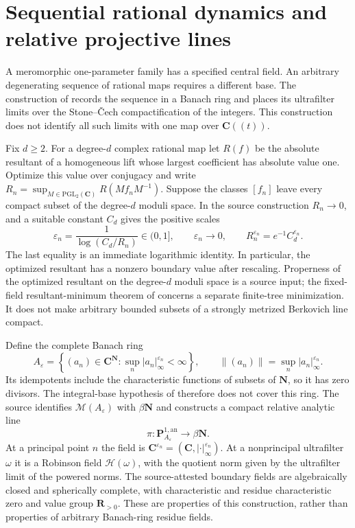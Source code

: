 \section{Sequential rational dynamics and relative projective lines}
\label{sec:hybrid-sequential-rational}

A meromorphic one-parameter family has a specified central field.
An arbitrary degenerating sequence of rational maps requires a different
base. The construction of \cite{FavreGong26SequentialV4} records the
sequence in a Banach ring and places its ultrafilter limits over the
Stone--\v{C}ech compactification of the integers. This construction
does not identify all such limits with one map over $\mathbf C((t))$.

Fix $d\geq2$. For a degree-$d$ complex rational map let $R(f)$ be
the absolute resultant of a homogeneous lift whose largest coefficient
has absolute value one. Optimize this value over conjugacy and write
$R_n=\sup_{M\in\mathrm{PGL}_2(\mathbf C)}R(Mf_nM^{-1})$.
Suppose the classes $[f_n]$ leave every compact subset of the degree-$d$
moduli space. In the source construction $R_n\to0$, and a suitable
constant $C_d$ gives the positive scales
\[
 \varepsilon_n=\frac{1}{\log(C_d/R_n)}\in(0,1],\qquad
 \varepsilon_n\longrightarrow0,\qquad
 R_n^{\varepsilon_n}=e^{-1}C_d^{\varepsilon_n}.
\tag{66.29l}\label{eq:hybrid-sequential-resultant-scale}
\]
The last equality is an immediate logarithmic identity. In particular,
the optimized resultant has a nonzero boundary value after rescaling.
Properness of the optimized resultant on the degree-$d$ moduli
space is a source input; the fixed-field resultant-minimum theorem of
\cite{Rumely13ResultantV2} concerns a separate finite-tree minimization.
It does not make arbitrary bounded subsets of a strongly metrized
Berkovich line compact.

Define the complete Banach ring
\[
 A_{\varepsilon}=\left\{(a_n)\in\mathbf C^{\mathbf N}:
                  \sup_n|a_n|_\infty^{\varepsilon_n}<\infty\right\},
 \qquad \|(a_n)\|=\sup_n|a_n|_\infty^{\varepsilon_n}.
\tag{66.29m}\label{eq:hybrid-sequential-Banach-ring}
\]
Its idempotents include the characteristic functions of subsets of
$\mathbf N$, so it has zero divisors. The integral-base hypothesis of
 therefore does not cover this ring.
The source identifies $\mathcal M(A_{\varepsilon})$ with
$\beta\mathbf N$ and constructs a compact relative analytic line
\[
 \pi:\mathbf P^{1,\mathrm{an}}_{A_{\varepsilon}}
                         \longrightarrow\beta\mathbf N.
\tag{66.29n}\label{eq:hybrid-sequential-relative-line}
\]
At a principal point $n$ the field is
$\mathbf C^{\varepsilon_n}=(\mathbf C,|\cdot|_\infty^{\varepsilon_n})$.
At a nonprincipal ultrafilter $\omega$ it is a Robinson field
$\mathcal H(\omega)$, with the quotient norm given by the ultrafilter
limit of the powered norms. The source-attested boundary fields are
algebraically closed and spherically complete, with characteristic and
residue characteristic zero and value group $\mathbf R_{>0}$.
These are properties of this construction, rather than properties
of arbitrary Banach-ring residue fields.

